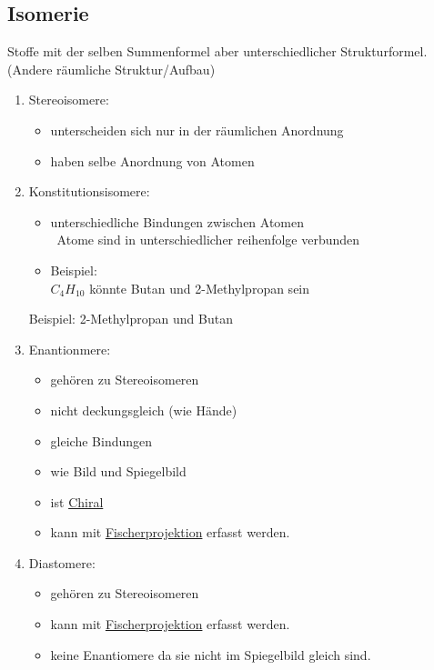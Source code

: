 \subsection{Isomerie}
Stoffe mit der selben Summenformel aber unterschiedlicher Strukturformel. (Andere räumliche Struktur/Aufbau)
\begin{enumerate}
    \item Stereoisomere:
        \begin{itemize}
            \item unterscheiden sich nur in der räumlichen Anordnung
            \item haben selbe Anordnung von Atomen
        \end{itemize}
    \item Konstitutionsisomere:
        \begin{itemize}
            \item unterschiedliche Bindungen zwischen Atomen \\
                \textrightarrow\ Atome sind in unterschiedlicher reihenfolge verbunden
            \item Beispiel: \\
                $C_4H_10$ könnte Butan und 2-Methylpropan sein
        \end{itemize}
        Beispiel: 2-Methylpropan und Butan
    \item Enantionmere:
        \begin{itemize}
            \item gehören zu Stereoisomeren
            \item nicht deckungsgleich (wie Hände)
            \item gleiche Bindungen
            \item wie Bild und Spiegelbild
            \item ist \hyperref[sec:chiral]{Chiral}
            \item kann mit \hyperref[sec:fischer]{Fischerprojektion} erfasst werden.
        \end{itemize}
    \item Diastomere:
        \begin{itemize}
            \item gehören zu Stereoisomeren
            \item kann mit \hyperref[sec:fischer]{Fischerprojektion} erfasst werden.
            \item keine Enantiomere da sie nicht im Spiegelbild gleich sind.
        \end{itemize}
\end{enumerate}

